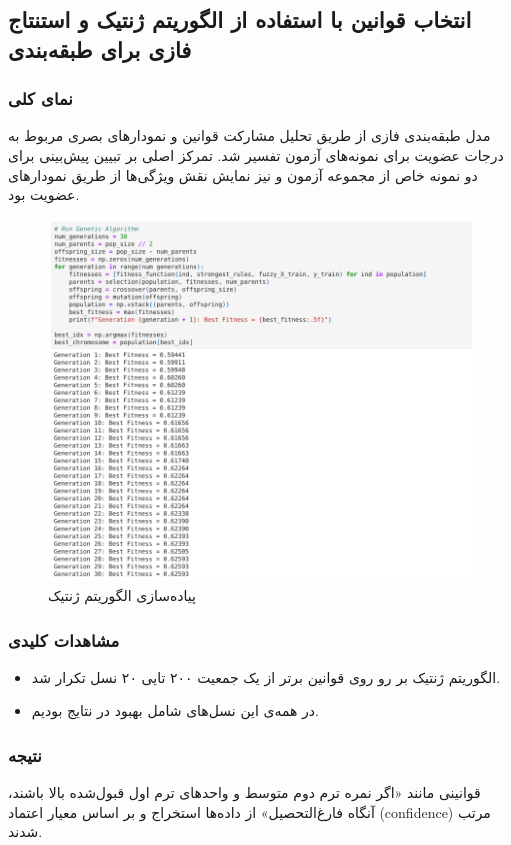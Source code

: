 \subsection{ انتخاب قوانین با استفاده از الگوریتم ژنتیک و  استنتاج فازی برای طبقه‌بندی} 

\subsubsection{نمای کلی}

مدل طبقه‌بندی فازی از طریق تحلیل مشارکت قوانین و نمودارهای بصری مربوط به درجات عضویت برای نمونه‌های آزمون تفسیر شد. تمرکز اصلی بر تبیین پیش‌بینی برای دو نمونه خاص از مجموعه آزمون و نیز نمایش نقش ویژگی‌ها از طریق نمودارهای عضویت بود.
\begin{figure}[H]
	\centering
	\includegraphics[width=0.7\linewidth]{img/ga}
	\caption[]{پیاده‌سازی الگوریتم ژنتیک}
	\label{fig:ga}
\end{figure}

\subsubsection{مشاهدات کلیدی}

\begin{itemize}
\item الگوریتم ژنتیک بر رو روی قوانین برتر از یک جمعیت ۲۰۰ تایی ۲۰ نسل تکرار شد. 
\item در همه‌ی این نسل‌های شامل بهبود در نتایج بودیم.
\end{itemize}

\subsubsection{نتیجه}
 قوانینی مانند «اگر نمره ترم دوم متوسط و واحدهای ترم اول قبول‌شده بالا باشند، آنگاه فارغ‌التحصیل» از داده‌ها استخراج و بر اساس معیار اعتماد (confidence) مرتب شدند.


